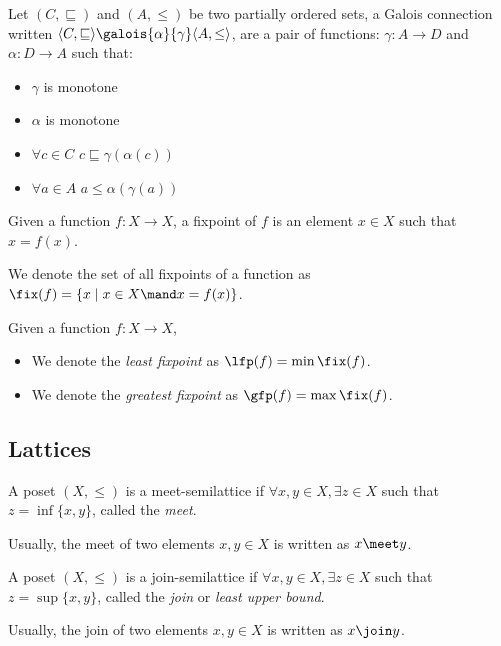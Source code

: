 \begin{definition}
  Let $(C, \sqsubseteq)$ and $(A, \leq)$ be two partially ordered sets, a 
  Galois connection written $\langle C, \sqsubseteq \rangle 
  \galois{\alpha}{\gamma} \langle A, \leq \rangle$, are a pair of functions:
  $\gamma : A \to D$ and $\alpha : D \to A$ such that:
  \begin{itemize}
    \item $\gamma$ is monotone
    \item $\alpha$ is monotone
    \item $\forall c \in C$ $c \sqsubseteq \gamma(\alpha(c))$
    \item $\forall a \in A$ $a \leq \alpha(\gamma(a))$
  \end{itemize}
\end{definition}

\begin{definition}[Fixpoint]
  Given a function $f : X \to X$, a fixpoint of $f$ is an element $x \in X$ 
  such that $x = f(x)$.

  We denote the set of all fixpoints of a function as $\fix(f) = 
  \{ x \mid x \in X \mand x = f(x) \}$.
\end{definition}

\begin{definition}
  Given a function $f : X \to X$,
  \begin{itemize}
    \item We denote the \textit{least fixpoint} as $\lfp(f) = \min \fix(f)$.
    \item We denote the \textit{greatest fixpoint} as $\gfp(f) = \max \fix(f)$.
  \end{itemize}
\end{definition}

\subsection{Lattices}

\begin{definition}
  A poset $(X, \leq)$ is a meet-semilattice if $\forall x, y \in X, \exists z 
  \in X$ such that $z = \inf \{x, y\}$, called the \textit{meet}.

  Usually, the meet of two elements $x, y \in X$ is written as $x \meet y$.
\end{definition}

\begin{definition}
  A poset $(X, \leq)$ is a join-semilattice if $\forall x, y \in X, \exists z 
  \in X$ such that $z = \sup \{x, y\}$, called the \textit{join} or 
  \textit{least upper bound}.

  Usually, the join of two elements $x, y \in X$ is written as $x \join y$.
\end{definition}

